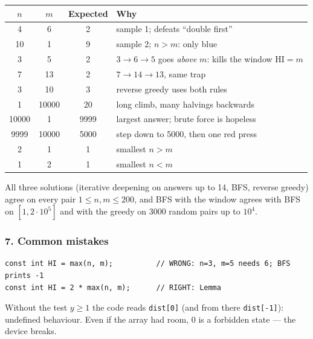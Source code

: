 \begin{testbox}
\centering\small
\begin{tabular}{@{}cccl@{}}
\toprule
$n$ & $m$ & \textbf{Expected} & \textbf{Why} \\
\midrule
4 & 6 & 2 & sample 1; defeats ``double first'' \\
10 & 1 & 9 & sample 2; $n > m$: only blue \\
3 & 5 & 2 & $3\to6\to5$ goes \emph{above} $m$: kills the window $\text{HI} = m$ \\
7 & 13 & 2 & $7\to14\to13$, same trap \\
3 & 10 & 3 & reverse greedy uses both rules \\
1 & 10000 & 20 & long climb, many halvings backwards \\
10000 & 1 & 9999 & largest answer; brute force is hopeless \\
9999 & 10000 & 5000 & step down to 5000, then one red press \\
2 & 1 & 1 & smallest $n > m$ \\
1 & 2 & 1 & smallest $n < m$ \\
\bottomrule
\end{tabular}
\end{testbox}

All three solutions (iterative deepening on answers up to 14, BFS, reverse greedy) agree on every pair $1 \le n, m \le 200$, and BFS with the window agrees with BFS on $[1, 2\cdot10^5]$ and with the greedy on 3000 random pairs up to $10^4$.

\subsubsection*{7. Common mistakes}

\begin{warningbox}
\begin{lstlisting}[style=snippet]
const int HI = max(n, m);          // WRONG: n=3, m=5 needs 6; BFS prints -1
const int HI = 2 * max(n, m);      // RIGHT: Lemma
\end{lstlisting}
\end{warningbox}

\begin{warningbox}
Without the test $y \ge 1$ the code reads \texttt{dist[0]} (and from there \texttt{dist[-1]}): undefined behaviour. Even if the array had room, 0 is a forbidden state --- the device breaks.
\end{warningbox}

